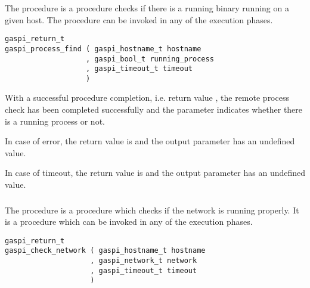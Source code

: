 The  procedure is a  
  procedure checks if there
is a running \GASPI{} binary running on a given host.
The procedure can be invoked in any of the \GASPI{} execution phases. 

\begin{FDef}
\begin{FDefSign}
\begin{verbatim}
gaspi_return_t
gaspi_process_find ( gaspi_hostname_t hostname
                   , gaspi_bool_t running_process
                   , gaspi_timeout_t timeout
                   )
\end{verbatim}
\end{FDefSign}
\parameterlistbegin
{}
\parameterlistend
\FStdRetDesc
\end{FDef}

With a successful procedure completion, i.e. return value
\GASPISUCC{}, the remote \GASPI{} process check has been 
completed successfully and the parameter 
indicates whether there is a running process or not.

In case of error, the return value is \GASPIGERR{} and the output parameter
 has an undefined value.

In case of timeout, the return value is \GASPITIME{} and the output parameter
 has an undefined value.



\subsubsection{}

The  procedure is a  
  procedure which checks if the network is
running properly. It is a procedure
which can be invoked in any of the \GASPI{} execution phases.

\begin{FDef}
\begin{FDefSign}
\begin{verbatim}
gaspi_return_t
gaspi_check_network ( gaspi_hostname_t hostname
                    , gaspi_network_t network
                    , gaspi_timeout_t timeout
                    )
\end{verbatim}
\end{FDefSign}
\parameterlistbegin
{}
\parameterlistend
\FStdRetDesc
\end{FDef}

